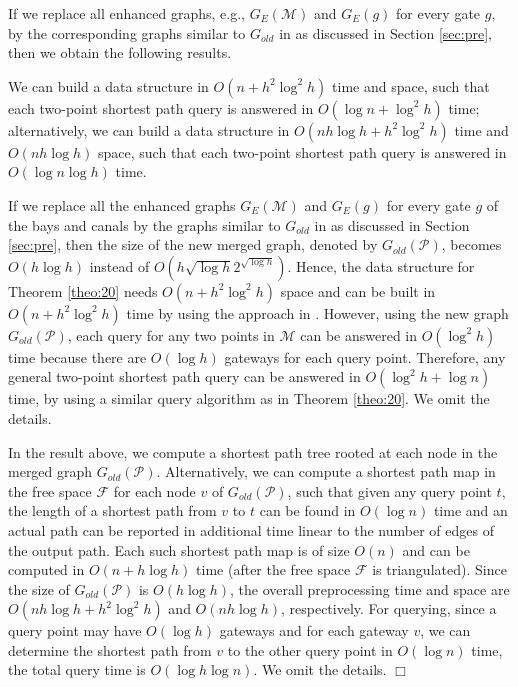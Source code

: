\documentclass[english,runningheads,11pt]{llncs}
\def\calP{\mathcal{P}}
\def\calM{\mathcal{M}}
\def\calF{\mathcal{F}}
\newenvironment{proof}{\noindent {\textbf{Proof:}}\rm}{\hfill $\Box$\rm}
\begin{document}
If we replace all enhanced graphs, e.g., $G_E(\calM)$ and $G_E(g)$ for
every gate $g$, by the corresponding graphs similar to $G_{old}$ in \cite{ref:ChenSh00}
as discussed in Section \ref{sec:pre}, then we obtain the following results.

\begin{corollary}
We can build a data structure in $O(n+h^2\log^2h)$ time and space,
such that each two-point shortest path query is answered in
$O(\log n+\log^2 h)$ time; alternatively,
we can build a data structure in $O(nh\log h+h^2\log^2 h)$ time and
$O(nh\log h)$ space, such that each two-point shortest path query is
answered in $O(\log n\log h)$ time.
\end{corollary}
\begin{proof}
If we replace all the enhanced graphs $G_E(\calM)$ and $G_E(g)$ for every gate $g$ of the
bays and canals by the graphs similar to $G_{old}$ in \cite{ref:ChenSh00}
as discussed in Section \ref{sec:pre}, then the size of the new merged graph,
denoted by $G_{old}(\calP)$, becomes $O(h\log h)$ instead of
$O(h\sqrt{\log h}2^{\sqrt{\log h}})$.
Hence, the data structure for Theorem \ref{theo:20}
needs $O(n+h^2\log^2 h)$ space and can be built in $O(n+h^2\log^2 h)$
time by using the approach in \cite{ref:ChenSh00}.
However, using the new graph $G_{old}(\calP)$, each query for any two points in
$\calM$ can be answered in $O(\log^2 h)$ time because there are $O(\log
h)$ gateways for each query point. Therefore, any general two-point
shortest path query can be answered in $O(\log^2 h+\log n)$ time, by
using a similar query algorithm as in Theorem \ref{theo:20}. We omit the details.

In the result above,
we compute a shortest path tree rooted at each node in the merged graph $G_{old}(\calP)$.
Alternatively, we can compute a shortest path map in the free space $\calF$ for
each node $v$ of $G_{old}(\calP)$, such that given any query point
$t$, the length of a shortest path from $v$ to $t$ can be found in
$O(\log n)$ time and an actual path can be reported in additional
time linear to the number of edges of the output path.
Each such shortest path map is of size $O(n)$ and can be computed in
$O(n+h\log h)$ time
\cite{ref:ChenA11ESA,ref:ChenCo12arXiv,ref:ChenL113STACS} (after
the free space $\calF$ is triangulated). Since the size
of $G_{old}(\calP)$ is $O(h\log h)$, the overall preprocessing time
and space are $O(nh\log
h+h^2\log^2 h)$ and $O(nh\log h)$, respectively. For querying, since
a query point may have
$O(\log h)$ gateways and for each gateway $v$, we can determine the
shortest path from $v$ to the other query point in $O(\log n)$ time,
the total query time is $O(\log h\log n)$. We omit the details.
\end{proof}
\end{document}
